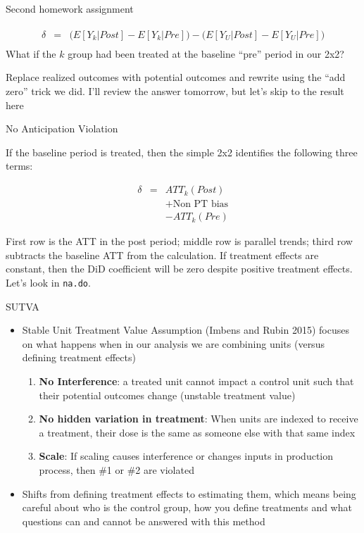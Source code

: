 \documentclass{beamer}
\begin{document}
\begin{frame}{Second homework assignment}


\begin{eqnarray*}
\widehat{\delta} &=& \bigg ( E[Y_k|Post] - E[Y_k|Pre] \bigg ) - \bigg ( E[Y_U | Post ] - E[ Y_U | Pre] \bigg) \\
\end{eqnarray*}What if the $k$ group had been treated at the baseline ``pre'' period in our 2x2?  

\bigskip

Replace realized outcomes with potential outcomes and rewrite using the ``add zero'' trick we did.  I'll review the answer tomorrow, but let's skip to the result here

\end{frame}

\begin{frame}{No Anticipation Violation}

If the baseline period is treated, then the simple 2x2 identifies the following three terms:

\begin{eqnarray*}
\delta &=& ATT_k(Post) \\&&+ \text{Non PT bias} \\&&- ATT_k(Pre)
\end{eqnarray*}

First row is the ATT in the post period; middle row is parallel trends; third row subtracts the baseline ATT from the calculation. If treatment effects are constant, then the DiD coefficient will be zero despite positive treatment effects.  Let's look in \texttt{na.do}.

\end{frame}



\begin{frame}{SUTVA}

\begin{itemize}
\item Stable Unit Treatment Value Assumption (Imbens and Rubin 2015) focuses on what happens when in our analysis we are combining units (versus defining treatment effects)
	\begin{enumerate}
	\item \textbf{No Interference}: a treated unit cannot impact a control unit such that their potential outcomes change (unstable treatment value)
	\item \textbf{No hidden variation in treatment}: When units are indexed to receive a treatment, their dose is the same as someone else with that same index
	\item \textbf{Scale}: If scaling causes interference or changes inputs in production process, then \#1 or \#2 are violated
	\end{enumerate}
\item Shifts from defining treatment effects to estimating them, which means being careful about who is the control group, how you define treatments and what questions can and cannot be answered with this method
\end{itemize}

\end{frame}
\end{document}
